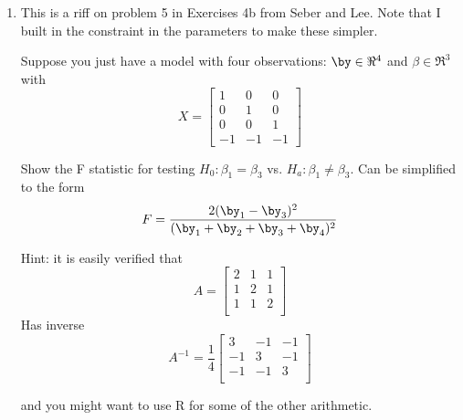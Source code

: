 \documentclass[10pt]{report}
\begin{document}
\begin{enumerate} 
\item 

This is a riff on problem 5 in Exercises 4b from Seber and Lee. Note 
 that I  built in the constraint in the parameters to make these simpler. 
 
Suppose  you just  have a model with four observations: $\by \in \Re^4$ and $\beta \in \Re^3$ with 
 \[ X=   \left[ \begin{array}{rrr}
                    1&0 & 0 \\
                    0&1 & 0  \\ 
                    0& 0 & 1 \\
                    -1 & -1 & -1 
                    \end{array} 
                    \right]
                    \]
                    
Show the  F statistic for testing $H_0 :  \beta_1 = \beta_3$  vs. $H_a :  \beta_1 \ne \beta_3$.
Can be simplified to the form 
\[ F =  \frac{2(\by_1 - \by_3)^2}{ (\by_1 + \by_2 +\by_3 +\by_4)^2}  \]

Hint: it is easily verified that  
\[ A =   \left[ \begin{array}{rrr}
                    2&1 & 1 \\
                    1&2 & 1  \\ 
                    1& 1& 2 \\
                    
                    \end{array} 
                    \right]               
                    \]
                    Has inverse
                               \[ A ^{-1}=   \frac{1}{4} \left[ \begin{array}{rrr}
                    3&-1 & -1 \\
                    -1&3 & -1  \\ 
                    -1& -1& 3 \\
                    
                    \end{array} 
                    \right]               
                    \]      
                    
                    and you might want to use R for some of the other arithmetic. 




\end{enumerate}
\end{document}
